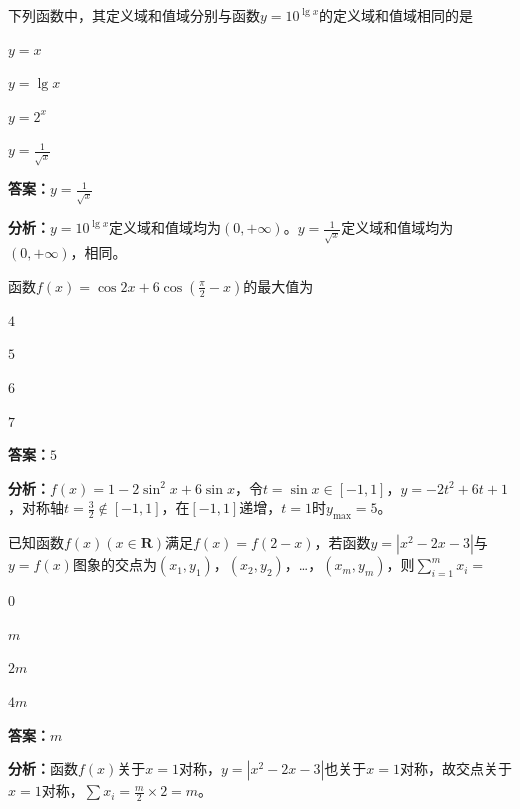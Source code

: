 \begin{question}[points=5]
下列函数中，其定义域和值域分别与函数$y=10^{\lg x}$的定义域和值域相同的是
\begin{choices}
  \item $y=x$
  \item $y=\lg x$
  \item $y=2^x$
  \item $y=\frac{1}{\sqrt{x}}$
\end{choices}
\begin{solution}
\textbf{答案：}$y=\frac{1}{\sqrt{x}}$

\textbf{分析：}$y=10^{\lg x}$定义域和值域均为$(0,+\infty)$。$y=\frac{1}{\sqrt{x}}$定义域和值域均为$(0,+\infty)$，相同。
\end{solution}
\end{question}

\begin{question}[points=5]
函数$f(x)=\cos2x+6\cos(\frac{\pi}{2}-x)$的最大值为
\begin{choices}
  \item $4$
  \item $5$
  \item $6$
  \item $7$
\end{choices}
\begin{solution}
\textbf{答案：}$5$

\textbf{分析：}$f(x)=1-2\sin^2x+6\sin x$，令$t=\sin x\in[-1,1]$，$y=-2t^2+6t+1$，对称轴$t=\frac{3}{2}\notin[-1,1]$，在$[-1,1]$递增，$t=1$时$y_{\max}=5$。
\end{solution}
\end{question}

\begin{question}[points=5]
已知函数$f(x)(x\in\mathbf{R})$满足$f(x)=f(2-x)$，若函数$y=|x^2-2x-3|$与$y=f(x)$图象的交点为$(x_1,y_1)$，$(x_2,y_2)$，…，$(x_m,y_m)$，则$\sum_{i=1}^m x_i=$
\begin{choices}
  \item $0$
  \item $m$
  \item $2m$
  \item $4m$
\end{choices}
\begin{solution}
\textbf{答案：}$m$

\textbf{分析：}函数$f(x)$关于$x=1$对称，$y=|x^2-2x-3|$也关于$x=1$对称，故交点关于$x=1$对称，$\sum x_i = \frac{m}{2}\times2=m$。
\end{solution}
\end{question}

